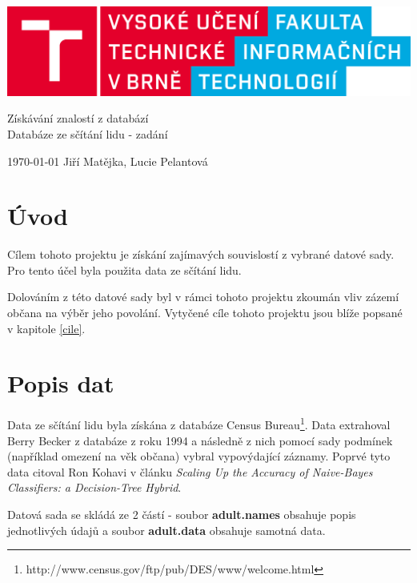 \documentclass[11pt,a4paper,titlepage]{article}
\begin{document}
		\begin{center}

			\includegraphics[width = 150mm]{img/logo.png}\\


			\LARGE
			Získávání znalostí z databází\\
			Databáze ze sčítání lidu - zadání\\

		\end{center}

	\Large{\today} \hfill Jiří Matějka, Lucie Pelantová
	\thispagestyle{empty}
	\newpage
	\setcounter{page}{1}

    \section{Úvod}
        Cílem tohoto projektu je získání zajímavých souvislostí z vybrané datové sady. Pro tento účel byla použita data ze sčítání lidu.
        
        Dolováním z této datové sady byl v rámci tohoto projektu zkoumán vliv zázemí občana na výběr jeho povolání. Vytyčené cíle tohoto projektu jsou blíže popsané v kapitole \ref{cile}.
    
    \section{Popis dat}
    Data ze sčítání lidu byla získána z databáze Census Bureau\footnote{http://www.census.gov/ftp/pub/DES/www/welcome.html}. Data extrahoval Berry Becker z databáze z roku 1994 a následně z nich pomocí sady podmínek (například omezení na věk občana)  vybral vypovýdající záznamy. Poprvé tyto data citoval Ron Kohavi v článku \textit{Scaling Up the Accuracy of Naive-Bayes Classifiers: a Decision-Tree Hybrid}.
    
        Datová sada se skládá ze 2 částí - soubor \textbf{adult.names} obsahuje popis jednotlivých údajů a soubor \textbf{adult.data} obsahuje samotná data.
    
\end{document}
